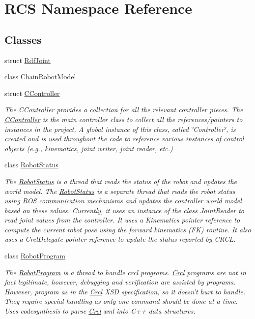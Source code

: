 \hypertarget{namespaceRCS}{\section{R\-C\-S Namespace Reference}
\label{namespaceRCS}
}
\subsection*{Classes}
\begin{DoxyCompactItemize}
\item 
struct \hyperlink{structRCS_1_1RdfJoint}{Rdf\-Joint}
\item 
class \hyperlink{classRCS_1_1ChainRobotModel}{Chain\-Robot\-Model}
\item 
struct \hyperlink{structRCS_1_1CController}{C\-Controller}
\begin{DoxyCompactList}\small\item\em The \hyperlink{structRCS_1_1CController}{C\-Controller} provides a collection for all the relevant controller pieces. The \hyperlink{structRCS_1_1CController}{C\-Controller} is the main controller class to collect all the references/pointers to instances in the project. A global instance of this class, called \char`\"{}\-Controller\char`\"{}, is created and is used throughout the code to reference various instances of control objects (e.\-g., kinematics, joint writer, joint reader, etc.) \end{DoxyCompactList}\item 
class \hyperlink{classRCS_1_1RobotStatus}{Robot\-Status}
\begin{DoxyCompactList}\small\item\em The \hyperlink{classRCS_1_1RobotStatus}{Robot\-Status} is a thread that reads the status of the robot and updates the world model. The \hyperlink{classRCS_1_1RobotStatus}{Robot\-Status} is a separate thread that reads the robot status using R\-O\-S communication mechanisms and updates the controller world model based on these values. Currently, it uses an instance of the class Joint\-Reader to read joint values from the controller. It uses a Kinematics pointer reference to compute the current robot pose using the forward kinematics (F\-K) routine. It also uses a Crcl\-Delegate pointer reference to update the status reported by C\-R\-C\-L. \end{DoxyCompactList}\item 
class \hyperlink{classRCS_1_1RobotProgram}{Robot\-Program}
\begin{DoxyCompactList}\small\item\em The \hyperlink{classRCS_1_1RobotProgram}{Robot\-Program} is a thread to handle crcl programs. \hyperlink{namespaceCrcl}{Crcl} programs are not in fact legitimate, however, debugging and verification are assisted by programs. However, program as in the \hyperlink{namespaceCrcl}{Crcl} X\-S\-D specification, so it doesn't hurt to handle. They require special handling as only one command should be done at a time. Uses codesynthesis to parse \hyperlink{namespaceCrcl}{Crcl} xml into C++ data structures. \end{DoxyCompactList}\item 

\end{DoxyCompactItemize}
